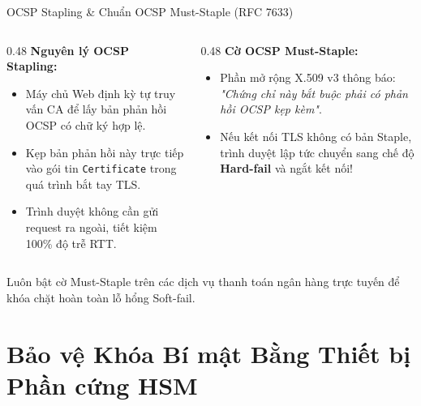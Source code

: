 \begin{frame}{OCSP Stapling \& Chuẩn OCSP Must-Staple (RFC 7633)}
  \begin{columns}[T]
    \begin{column}{0.48\textwidth}
      \textbf{Nguyên lý OCSP Stapling:}
      \begin{itemize}\small
        \item Máy chủ Web định kỳ tự truy vấn CA để lấy bản phản hồi OCSP có chữ ký hợp lệ.
        \item Kẹp bản phản hồi này trực tiếp vào gói tin \texttt{Certificate} trong quá trình bắt tay TLS.
        \item Trình duyệt không cần gửi request ra ngoài, tiết kiệm 100\% độ trễ RTT.
      \end{itemize}
    \end{column}
    \begin{column}{0.48\textwidth}
      \textbf{Cờ OCSP Must-Staple:}
      \begin{itemize}\small
        \item Phần mở rộng X.509 v3 thông báo: \emph{"Chứng chỉ này bắt buộc phải có phản hồi OCSP kẹp kèm"}.
        \item Nếu kết nối TLS không có bản Staple, trình duyệt lập tức chuyển sang chế độ \textbf{Hard-fail} và ngắt kết nối!
      \end{itemize}
    \end{column}
  \end{columns}

  \begin{keybox}
    Luôn bật cờ Must-Staple trên các dịch vụ thanh toán ngân hàng trực tuyến để khóa chặt hoàn toàn lỗ hổng Soft-fail.
  \end{keybox}
\end{frame}

\section{Bảo vệ Khóa Bí mật Bằng Thiết bị Phần cứng HSM}

